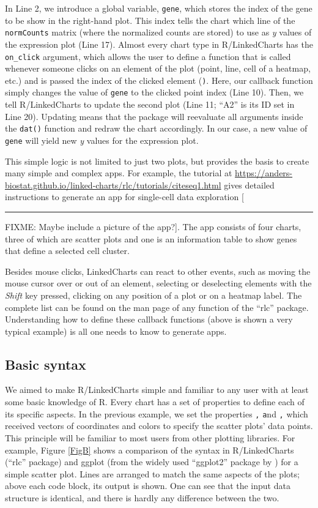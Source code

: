\documentclass[twocolumn,10pt]{article}
\newcommand{\blockade}{\rule{3em}{0.7em}}  %
\newcommand{\fixme}[1]{[ \blockade FIXME: #1]}
\begin{document}
In Line 2, we introduce a global variable, \texttt{gene}, which stores the index of the gene to be show in the right-hand plot. This index tells the chart which line of the \texttt{normCounts} matrix (where the normalized counts are stored) to use as \emph{y} values of the expression plot (Line 17). Almost every chart type in R/LinkedCharts has the \texttt{on_click} argument, which allows the user to define a function that is called whenever someone clicks on an element of the plot (point, line, cell of a heatmap, etc.) and is passed the index of the clicked element (\texttt).  Here, our callback function simply changes the value of \texttt{gene} to the clicked point index (Line 10). Then, we tell R/LinkedCharts to update the second plot (Line 11; ``A2'' is its ID set in Line 20). Updating means that the package will reevaluate all arguments inside the \texttt{dat()} function and redraw the chart accordingly. In our case, a new value of \texttt{gene} will yield new \emph{y} values for the expression plot.

This simple logic is not limited to just two plots, but provides the basis to create many simple and complex apps. For example, the tutorial at \url{https://anders-biostat.github.io/linked-charts/rlc/tutorials/citeseq1.html} gives detailed instructions to generate an app for single-cell data exploration \fixme{Maybe include a picture of the app?}. The app consists of four charts, three of which are scatter plots and one is an information table to show genes that define a selected cell cluster.

Besides mouse clicks, LinkedCharts can react to other events, such as moving the mouse cursor over or out of an element, selecting or deselecting elements with the \emph{Shift} key pressed, clicking on any position of a plot or on a heatmap label. The complete list can be found on the man page of any function of the ``rlc'' package. Understanding how to define these callback functions (above is shown a very typical example) is all one needs to know to generate apps. 

\subsection{Basic syntax}

We aimed to make R/LinkedCharts simple and familiar to any user with at least some basic knowledge of R. Every chart has a set of properties to define each of its specific aspects. In the previous example, we set the properties \texttt, \texttt and \texttt, which received vectors of coordinates and colors to specify the scatter plots' data points. This principle will be familiar to most users from other plotting libraries. For example, Figure \ref{FigB} shows a comparison of the syntax in R/LinkedCharts (``rlc'' package) and ggplot (from the widely used ``ggplot2'' package by \citet{wickham_2016}) for a simple scatter plot. Lines are arranged to match the same aspects of the plots; above each code block, its output is shown. One can see that the input data structure is identical, and there is hardly any difference between the two.
\end{document}
